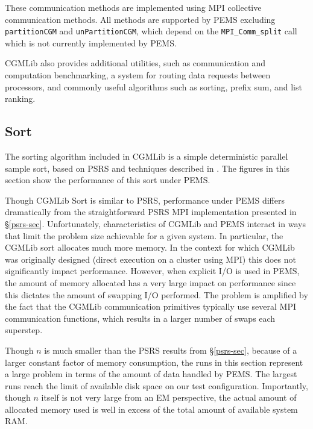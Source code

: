 \documentclass[12pt]{carletoncsthesis}
\begin{document}
These communication methods are implemented using MPI collective communication
methods.  All methods are supported by PEMS excluding {\tt partitionCGM}
and {\tt unPartitionCGM}, which depend on the {\tt MPI\_Comm\_split} call
which is not currently implemented by PEMS.

CGMLib also provides additional utilities, such as communication and computation
benchmarking, a system for routing data requests between processors, and commonly
useful algorithms such as sorting, prefix sum, and list ranking.

\subsection{Sort}

The sorting algorithm included in CGMLib is a simple deterministic
parallel sample sort, based on PSRS \cite{psrs} and techniques described
in \cite{cgmlibsort}.  The figures in this section show the performance of
this sort under PEMS.

Though CGMLib Sort is similar to PSRS, performance under PEMS differs
dramatically from the straightforward PSRS MPI implementation presented
in \S\ref{psrs-sec}.  Unfortunately, characteristics of CGMLib and PEMS
interact in ways that limit the problem size achievable for a given system.
In particular, the CGMLib sort allocates much more memory.  In the context
for which CGMLib was originally designed (direct execution on a cluster using
MPI) this does not significantly impact performance.  However, when explicit
I/O is used in PEMS, the amount of memory allocated has a very large impact
on performance since this dictates the amount of swapping I/O performed.
The problem is amplified by the fact that the CGMLib communication primitives
typically use several MPI communication functions, which results in a larger
number of swaps each superstep.

Though $n$ is much smaller than the PSRS results from \S\ref{psrs-sec},
because of a larger constant factor of memory consumption, the runs in this
section represent a large problem in terms of the amount of data handled
by PEMS.  The largest runs reach the limit of available disk space on our
test configuration.  Importantly, though $n$ itself is not very large from
an EM perspective, the actual amount of allocated memory used is well in
excess of the total amount of available system RAM.
\end{document}
